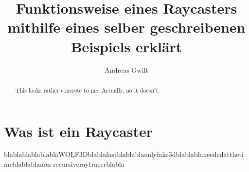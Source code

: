 \documentclass[a4paper,11pt]{article}
\title{Funktionsweise eines Raycasters mithilfe eines selber geschreibenen Beispiels erkl\"art}
\author{Andreas Gwilt}
\begin{document}
\maketitle
\tableofcontents

\begin{abstract}
This looks rather concrete to me. Actually, no it doesn't.
\end{abstract}

\section{Was ist ein Raycaster}
blablablablablablaWOLF3Dblablafastblablablaonlyfake3dblablablaneededatthetimeblablablanon-recursiveraytracerblabla
\end{document}

